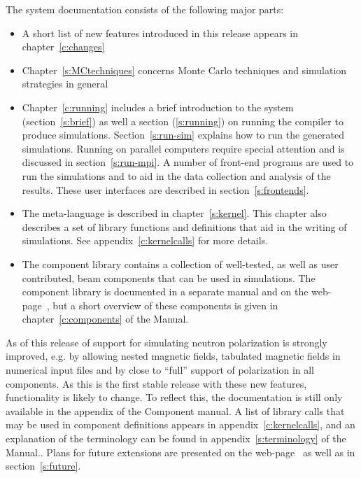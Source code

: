 The \MCS system documentation consists of the following major
parts:
\begin{itemize}
\item A short list of new features introduced in this \MCS release
  appears in chapter~\ref{c:changes}
\item Chapter~\ref{s:MCtechniques} concerns Monte Carlo techniques
  and simulation strategies in general
\item Chapter~\ref{c:running} includes a brief introduction to the
  \MCS system
  (section~\ref{s:brief}) as well a section (\ref{s:running}) on running the compiler to produce
  simulations. Section~\ref{s:run-sim} explains how to run the generated
  simulations. Running \MCS on parallel computers require special
  attention and is discussed in section~\ref{s:run-mpi}. A number of front-end programs are used to run the
  simulations and to aid in the data collection and analysis of the
  results. These user interfaces are described in section~\ref{s:frontends}.
\item The \MCS meta-language is described in chapter~\ref{s:kernel}. This
  chapter also describes a set of library functions and definitions
  that aid in the writing of simulations. See
  appendix~\ref{c:kernelcalls} for more details.
\item The \MCS component library contains a collection of
  well-tested, as well as user contributed, beam components that can be used in simulations.
  The \MCS component library is documented in a separate manual
  and on the \MCS web-page~\cite{mcstas_webpage}, but a short overview of these
  components is given in chapter~\ref{c:components} of the Manual.

\end{itemize}

As of this release of \MCS support for simulating neutron
polarization is strongly improved, e.g. by allowing nested magnetic
fields, tabulated magnetic fields in numerical input files and by close
to ``full'' support of polarization in all components. As this is the
first stable release with these new features, functionality is likely to change. To reflect this, the
documentation is still only available in the appendix of the Component manual. %
A list of library calls that may be used in component definitions
appears in appendix~\ref{c:kernelcalls}, and
an explanation of the \MCS terminology can be
found in appendix~\ref{s:terminology} of the Manual..
Plans for future extensions are presented on the \MCS web-page~\cite{mcstas_webpage} as well as in section~\ref{s:future}.


